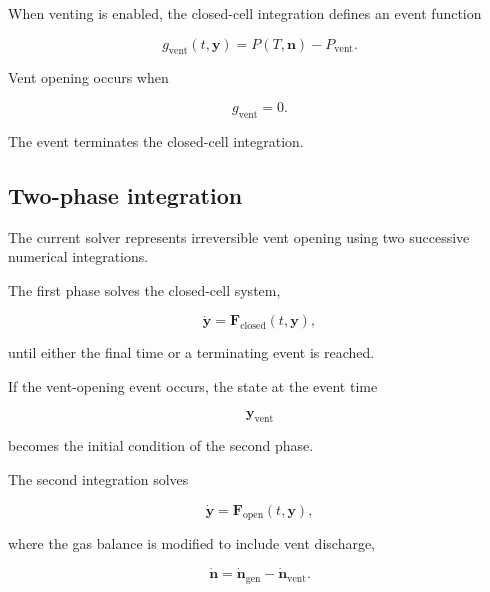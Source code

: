 When venting is enabled, the closed-cell integration defines an event
function

\begin{equation}
    g_{\mathrm{vent}}
    \left(
        t,
        \mathbf{y}
    \right)
    =
    P
    \left(
        T,
        \mathbf{n}
    \right)
    -
    P_{\mathrm{vent}}.
    \label{eq:vent_event_function}
\end{equation}

Vent opening occurs when

\begin{equation}
    g_{\mathrm{vent}}
    =
    0.
\end{equation}

The event terminates the closed-cell integration.


\subsection{Two-phase integration}

The current solver represents irreversible vent opening using two
successive numerical integrations.

The first phase solves the closed-cell system,

\begin{equation}
    \dot{\mathbf{y}}
    =
    \mathbf{F}_{\mathrm{closed}}
    \left(
        t,
        \mathbf{y}
    \right),
\end{equation}

until either the final time or a terminating event is reached.

If the vent-opening event occurs, the state at the event time

\begin{equation}
    \mathbf{y}_{\mathrm{vent}}
\end{equation}

becomes the initial condition of the second phase.

The second integration solves

\begin{equation}
    \dot{\mathbf{y}}
    =
    \mathbf{F}_{\mathrm{open}}
    \left(
        t,
        \mathbf{y}
    \right),
\end{equation}

where the gas balance is modified to include vent discharge,

\begin{equation}
    \dot{\mathbf{n}}
    =
    \dot{\mathbf{n}}_{\mathrm{gen}}
    -
    \dot{\mathbf{n}}_{\mathrm{vent}}.
    \label{eq:rhs_open_gas}
\end{equation}


